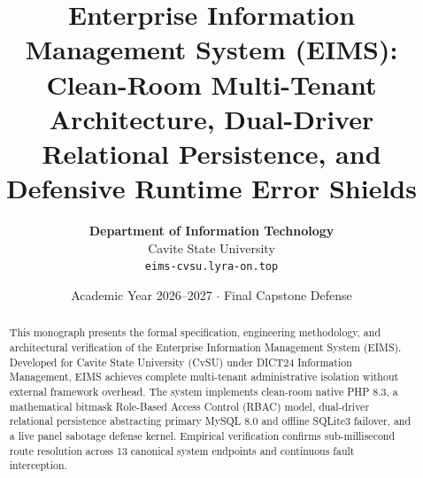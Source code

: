 \documentclass[11pt,a4paper]{article}
\title{\textbf{Enterprise Information Management System (EIMS):}\\\large Clean-Room Multi-Tenant Architecture, Dual-Driver Relational Persistence, and Defensive Runtime Error Shields}
\author{
    \textbf{Department of Information Technology}\\
    Cavite State University\\
    \texttt{eims-cvsu.lyra-on.top}
}
\date{Academic Year 2026--2027 $\cdot$ Final Capstone Defense}
\begin{document}
\maketitle

\begin{abstract}
This monograph presents the formal specification, engineering methodology, and architectural verification of the Enterprise Information Management System (EIMS). Developed for Cavite State University (CvSU) under DICT24 Information Management, EIMS achieves complete multi-tenant administrative isolation without external framework overhead. The system implements clean-room native PHP 8.3, a mathematical bitmask Role-Based Access Control (RBAC) model, dual-driver relational persistence abstracting primary MySQL 8.0 and offline SQLite3 failover, and a live panel sabotage defense kernel. Empirical verification confirms sub-millisecond route resolution across 13 canonical system endpoints and continuous fault interception.
\end{abstract}

\tableofcontents
\newpage










\end{document}
